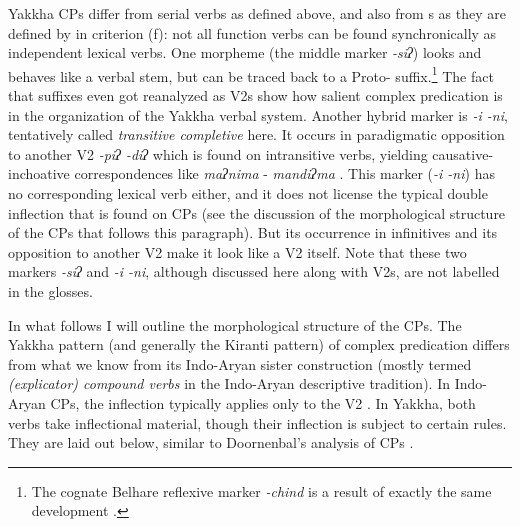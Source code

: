 Yakkha CPs differ from  serial verbs as defined above, and also from s as they are defined by \citet[362]{Schultze-Berndt2006_Taking} in criterion (f): not all function verbs can be found synchronically as independent lexical verbs. One morpheme (the middle marker \emph{-siʔ}) looks and behaves like a verbal stem, but can be traced back to a Proto- suffix.\footnote{The cognate Belhare reflexive marker \emph{-chind} is a result of exactly  the same development \citep[560]{Bickel2003Belhare}.} The fact that suffixes even got reanalyzed as V2s show how salient complex predication is in the organization of the Yakkha verbal system. Another hybrid marker is \emph{-i \ti -ni}, tentatively called \emph{transitive completive} here. It occurs in paradigmatic opposition to another V2 \emph{-piʔ \ti -diʔ}  which is found on intransitive verbs, yielding causative-inchoative correspondences like \emph{maʔnima}  - \emph{mandiʔma} . This marker (\emph{-i \ti -ni}) has no corresponding lexical verb either, and it does not license the typical double inflection that is found on CPs (see the discussion of the morphological structure of the CPs that follows this paragraph). But its occurrence in infinitives and its opposition to another V2 make it look like a V2 itself. Note that these two markers \emph{-siʔ} and \emph{-i \ti -ni}, although discussed here along with V2s, are not labelled  in the glosses.

In what follows I will outline the morphological structure of the CPs. The Yakkha pattern (and generally the Kiranti pattern) of complex predication differs from what we know from its Indo-Aryan sister construction (mostly termed \emph{(explicator) compound verbs} in the Indo-Aryan descriptive tradition). In Indo-Aryan CPs, the inflection  typically applies only to the V2 \citep{Montaut2004Hindi, Butt1997_Complex, Hook1991_Emergence}. In Yakkha, both verbs take inflectional material, though their inflection is subject to certain rules. They are laid out below, similar to Doornenbal's analysis of  CPs \citep[251]{Doornenbal2009A-grammar}.

